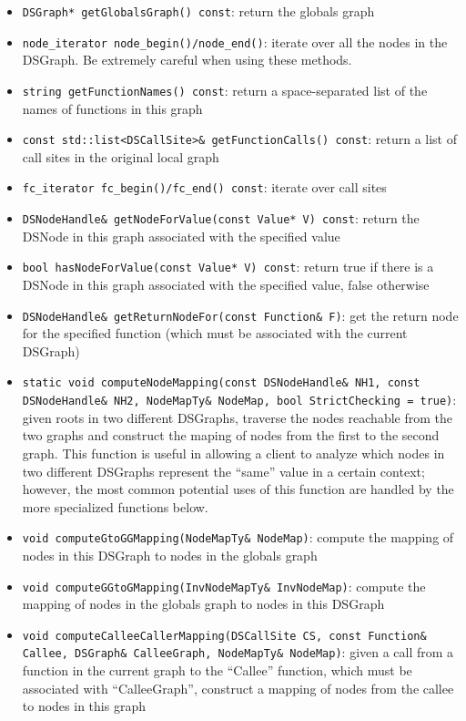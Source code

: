 \documentclass{article}
\begin{document}
\begin{itemize}
\item \texttt{DSGraph* getGlobalsGraph() const}: return the globals
  graph
\item \texttt{node\_iterator node\_begin()/node\_end()}: iterate over all the nodes
  in the DSGraph.  Be extremely careful when using these methods.
\item \texttt{string getFunctionNames() const}: return a
  space-separated list of the names of functions in this graph
\item \texttt{const std::list<DSCallSite>\& getFunctionCalls() const}:
  return a list of call sites in the original local graph
\item \texttt{fc\_iterator fc\_begin()/fc\_end() const}: iterate over
  call sites
\item \texttt{DSNodeHandle\& getNodeForValue(const Value* V) const}:
  return the DSNode in this graph associated with the specified value
\item \texttt{bool hasNodeForValue(const Value* V) const}: return true
  if there is a DSNode in this graph associated with the specified
  value, false otherwise
\item \texttt{DSNodeHandle\& getReturnNodeFor(const Function\& F)}: get
  the return node for the specified function (which must be associated
  with the current DSGraph)
\item \texttt{static void computeNodeMapping(const DSNodeHandle\& NH1,
  const DSNodeHandle\& NH2, NodeMapTy\& NodeMap, bool StrictChecking =
  true)}: given roots in two different DSGraphs, traverse the nodes
  reachable from the two graphs and construct the maping of nodes from
  the first to the second graph.  This function is useful in allowing
  a client to analyze which nodes in two different DSGraphs represent
  the ``same'' value in a certain context; however, the most common
  potential uses of this function are handled by the more specialized
  functions below.
\item \texttt{void computeGtoGGMapping(NodeMapTy\& NodeMap)}: compute
  the mapping of nodes in this DSGraph to nodes in the globals graph
\item \texttt{void computeGGtoGMapping(InvNodeMapTy\& InvNodeMap)}:
  compute the mapping of nodes in the globals graph to nodes in this
  DSGraph
\item \texttt{void computeCalleeCallerMapping(DSCallSite CS, const
  Function\& Callee, DSGraph\& CalleeGraph, NodeMapTy\& NodeMap)}: given
  a call from a function in the current graph to the ``Callee''
  function, which must be associated with ``CalleeGraph'', construct a
  mapping of nodes from the callee to nodes in this graph
\end{itemize}
\end{document}
